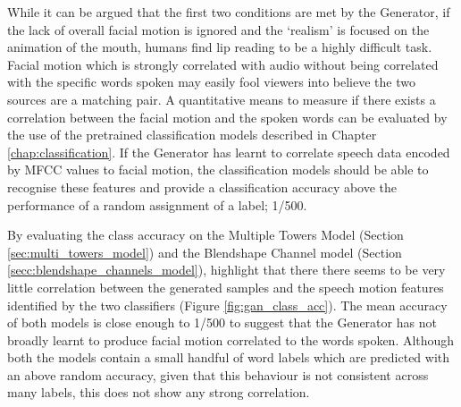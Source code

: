 While it can be argued that the first two conditions are met by the Generator, if the lack of overall facial motion is ignored and the `realism' is focused on the animation of the mouth, humans find lip reading to be a highly difficult task.
Facial motion which is strongly correlated with audio without being correlated with the specific words spoken may easily fool viewers into believe the two sources are a matching pair.
A quantitative means to measure if there exists a correlation between the facial motion and the spoken words can be evaluated by the use of the pretrained classification models described in Chapter \ref{chap:classification}.
If the Generator has learnt to correlate speech data encoded by MFCC values to facial motion, the classification models should be able to recognise these features and provide a classification accuracy above the performance of a random assignment of a label; 1/500.

By evaluating the class accuracy on the Multiple Towers Model (Section \ref{sec:multi_towers_model}) and the Blendshape Channel model (Section \ref{secc:blendshape_channels_model}), highlight that there there seems to be very little correlation between the generated samples and the speech motion features identified by the two classifiers (Figure \ref{fig:gan_class_acc}).
The mean accuracy of both models is close enough to 1/500 to suggest that the Generator has not broadly learnt to produce facial motion correlated to the words spoken.
Although both the models contain a small handful of word labels which are predicted with an above random accuracy, given that this behaviour is not consistent across many labels, this does not show any strong correlation.

